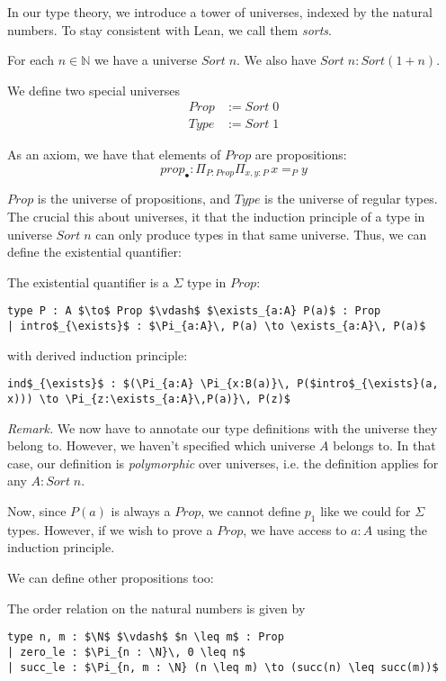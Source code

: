 \documentclass[a4paper, 12pt]{article}
\newcommand{\N}{\mathbb{N}}
\newcommand{\Prop}{\mathit{Prop}}
\newcommand{\Type}{\mathit{Type}}
\newcommand{\Sort}{\mathit{Sort\;}}
\renewcommand{\Prop}{\mathit{Prop}}
\theoremstyle{changedot}
\theoremstyle{changedotbreak}
\theoremstyle{nonumberplain}
\begin{document}
In our type theory, we introduce a tower of universes, indexed by the natural numbers. To stay consistent with Lean, we call them \textit{sorts}.

\begin{definition}
  For each $n \in \N$ we have a universe $\Sort n$. We also have $\Sort n : Sort(1+n)$.

  We define two special universes
  \begin{align*}
    \Prop &:= \Sort 0\\
    \Type &:= \Sort 1
  \end{align*}

  As an axiom, we have that elements of $\Prop$ are propositions:
  \[prop_{\bullet} : \Pi_{P:\Prop}\Pi_{x, y:P}\, x=_{P}y\]
\end{definition}

$\Prop$ is the universe of propositions, and $\Type$ is the universe of regular types. The crucial this about universes, it that the induction principle of a type in universe $\Sort n$ can only produce types in that same universe. Thus, we can define the existential quantifier:

\begin{definition}
  The existential quantifier is a $\Sigma$ type in $\Prop$:
\begin{lstlisting}
type P : A $\to$ Prop $\vdash$ $\exists_{a:A} P(a)$ : Prop
| intro$_{\exists}$ : $\Pi_{a:A}\, P(a) \to \exists_{a:A}\, P(a)$
\end{lstlisting}
  with derived induction principle:
\begin{lstlisting}
ind$_{\exists}$ : $(\Pi_{a:A} \Pi_{x:B(a)}\, P($intro$_{\exists}(a, x))) \to \Pi_{z:\exists_{a:A}\,P(a)}\, P(z)$
\end{lstlisting}
\end{definition}
\textit{Remark.} We now have to annotate our type definitions with the universe they belong to. However, we haven't specified which universe $A$ belongs to. In that case, our definition is \textit{polymorphic} over universes, i.e. the definition applies for any $A : \Sort n$.

Now, since $P(a)$ is always a $\Prop$, we cannot define $p_{1}$ like we could for $\Sigma$ types. However, if we wish to prove a $\Prop$, we have access to $a:A$ using the induction principle.

We can define other propositions too:

\begin{definition}
  The order relation on the natural numbers is given by
\begin{lstlisting}
type n, m : $\N$ $\vdash$ $n \leq m$ : Prop
| zero_le : $\Pi_{n : \N}\, 0 \leq n$
| succ_le : $\Pi_{n, m : \N} (n \leq m) \to (succ(n) \leq succ(m))$
\end{lstlisting}
\end{definition}
\end{document}
